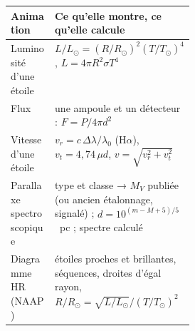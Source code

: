 \begin{center}
\small
\begin{tabularx}{\linewidth}{@{}>{\raggedright}p{0.30\linewidth}X@{}}
\toprule
Animation & Ce qu'elle montre, ce qu'elle calcule\\
\midrule
Luminosité d'une étoile & $L/L_\odot=(R/R_\odot)^2(T/T_\odot)^4$, $L=4\pi R^2\sigma T^4$\\
Flux & une ampoule et un détecteur : $F=P/4\pi d^2$\\
Vitesse d'une étoile & $v_r=c\,\Delta\lambda/\lambda_0$ (H$\alpha$), $v_t=4{,}74\,\mu d$, $v=\sqrt{v_r^2+v_t^2}$\\
Parallaxe spectroscopique & type et classe → $M_V$ publiée (ou ancien étalonnage, signalé) ; $d=10^{(m-M+5)/5}$~pc ; spectre calculé\\
Diagramme HR (NAAP) & étoiles proches et brillantes, séquences, droites d'égal rayon, $R/R_\odot=\sqrt{L/L_\odot}/(T/T_\odot)^2$\\
\bottomrule
\end{tabularx}
\end{center}

